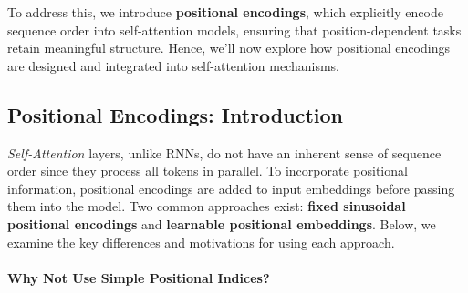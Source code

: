 \noindent To address this, we introduce \textbf{positional encodings}, which explicitly encode sequence order into self-attention models, ensuring that position-dependent tasks retain meaningful structure. Hence, we'll now explore how positional encodings are designed and integrated into self-attention mechanisms.

\subsection{Positional Encodings: Introduction}
\label{sec:chapter17_positional_encodings}

\noindent
\textit{Self-Attention} layers, unlike RNNs, do not have an inherent sense of sequence order since they process all tokens in parallel.
To incorporate positional information, positional encodings are added to input embeddings before passing them into the model.
Two common approaches exist: \textbf{fixed sinusoidal positional encodings} and \textbf{learnable positional embeddings}.
Below, we examine the key differences and motivations for using each approach.

\paragraph{Why Not Use Simple Positional Indices?}
\label{par:chapter17_why_not_positional_indices}

